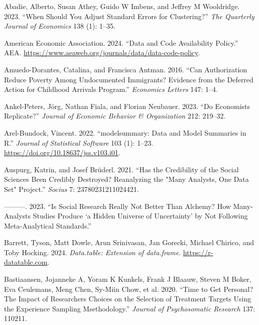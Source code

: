 \documentclass[
  letterpaper,
  DIV=11,
  numbers=noendperiod]{scrartcl}
\newlength{\cslhangindent}
\newenvironment{CSLReferences}[2] %
 {\begin{list}{}{%
  \setlength{\itemindent}{0pt}
  \setlength{\leftmargin}{0pt}
  \setlength{\parsep}{0pt}
  \ifodd #1
   \setlength{\leftmargin}{\cslhangindent}
   \setlength{\itemindent}{-1\cslhangindent}
  \fi
  \setlength{\itemsep}{#2\baselineskip}}}
 {\end{list}}
\begin{document}
\label{refs}
\begin{CSLReferences}{1}{0}
Abadie, Alberto, Susan Athey, Guido W Imbens, and Jeffrey M Wooldridge.
2023. {``When Should You Adjust Standard Errors for Clustering?''}
\emph{The Quarterly Journal of Economics} 138 (1): 1--35.

American Economic Association. 2024. {``Data and Code Availability
Policy.''} AEA.
\url{https://www.aeaweb.org/journals/data/data-code-policy}.

Amuedo-Dorantes, Catalina, and Francisca Antman. 2016. {``Can
Authorization Reduce Poverty Among Undocumented Immigrants? Evidence
from the Deferred Action for Childhood Arrivals Program.''}
\emph{Economics Letters} 147: 1--4.

Ankel-Peters, Jörg, Nathan Fiala, and Florian Neubauer. 2023. {``Do
Economists Replicate?''} \emph{Journal of Economic Behavior \&
Organization} 212: 219--32.

Arel-Bundock, Vincent. 2022. {``{modelsummary}: Data and Model Summaries
in {R}.''} \emph{Journal of Statistical Software} 103 (1): 1--23.
\url{https://doi.org/10.18637/jss.v103.i01}.

Auspurg, Katrin, and Josef Brüderl. 2021. {``Has the Credibility of the
Social Sciences Been Credibly Destroyed? Reanalyzing the "Many Analysts,
One Data Set" Project.''} \emph{Socius} 7: 23780231211024421.

---------. 2023. {``Is Social Research Really Not Better Than Alchemy?
How Many-Analysts Studies Produce {`a Hidden Universe of Uncertainty'}
by Not Following Meta-Analytical Standards.''}

Barrett, Tyson, Matt Dowle, Arun Srinivasan, Jan Gorecki, Michael
Chirico, and Toby Hocking. 2024. \emph{Data.table: Extension of
{data.frame}}. \url{https://r-datatable.com}.

Bastiaansen, Jojanneke A, Yoram K Kunkels, Frank J Blaauw, Steven M
Boker, Eva Ceulemans, Meng Chen, Sy-Miin Chow, et al. 2020. {``Time to
Get Personal? The Impact of Researchers Choices on the Selection of
Treatment Targets Using the Experience Sampling Msethodology.''}
\emph{Journal of Psychosomatic Research} 137: 110211.


\end{CSLReferences}
\end{document}
